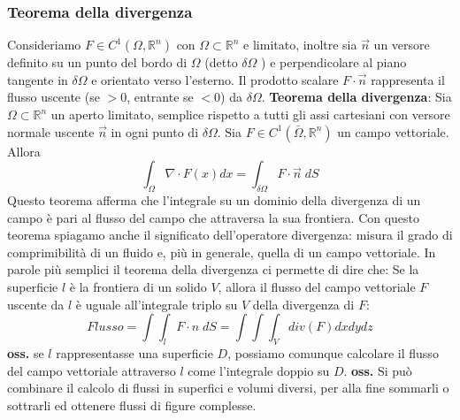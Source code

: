 \subsubsection{Teorema della divergenza}
Consideriamo $F \in C^1(\Omega, \mathbb{R}^n)$ con $\Omega \subset \mathbb{R}^n$ e limitato, inoltre sia $\vec{n}$ un versore definito su un punto del bordo di $\Omega$ (detto $\delta\Omega$ ) e perpendicolare al piano tangente in $\delta \Omega$ e orientato verso l'esterno.\newline
Il prodotto scalare $F \cdot \vec{n}$ rappresenta il flusso uscente (se $> 0$, entrante se $<0$)  da $\delta\Omega$.\newline
\newline
\textbf{Teorema della divergenza}:\newline
Sia $\Omega \subset \mathbb{R}^n$ un aperto limitato, semplice rispetto a tutti gli assi cartesiani con versore normale uscente $\vec{n}$ in ogni punto di $\delta\Omega$. Sia $F \in C^1(\bar{\Omega}, \mathbb{R}^n)$ un campo vettoriale. Allora
\[
    \int_\Omega \nabla \cdot  F(x) dx = \int_{\delta\Omega} F \cdot  \vec{n} \; dS
\]
Questo teorema afferma che l'integrale su un dominio della divergenza di un campo è pari al flusso del campo che attraversa la sua frontiera.\newline
Con questo teorema spiagamo anche il significato dell'operatore divergenza: misura il grado di comprimibilità di un fluido e, più in generale, quella di un campo vettoriale.\newline
\newline
In parole più semplici il teorema della divergenza ci permette di dire che:\newline
Se la superficie $l$ è la frontiera di un solido $V$, allora il flusso del campo vettoriale $F$ uscente da $l$ è uguale all'integrale triplo su $V$ della divergenza di $F$:
\[
    Flusso = \int \int_{l}F \cdot n \; dS = \int \int \int_{V} div(F) dx dy dz
\]
\textbf{oss.} se $l$ rappresentasse una superficie $D$, possiamo comunque calcolare il flusso del campo vettoriale attraverso $l$ come l'integrale doppio su $D$.\newline
\textbf{oss.} Si può combinare il calcolo di flussi in superfici e volumi diversi, per alla fine sommarli o sottrarli ed ottenere flussi di figure complesse.